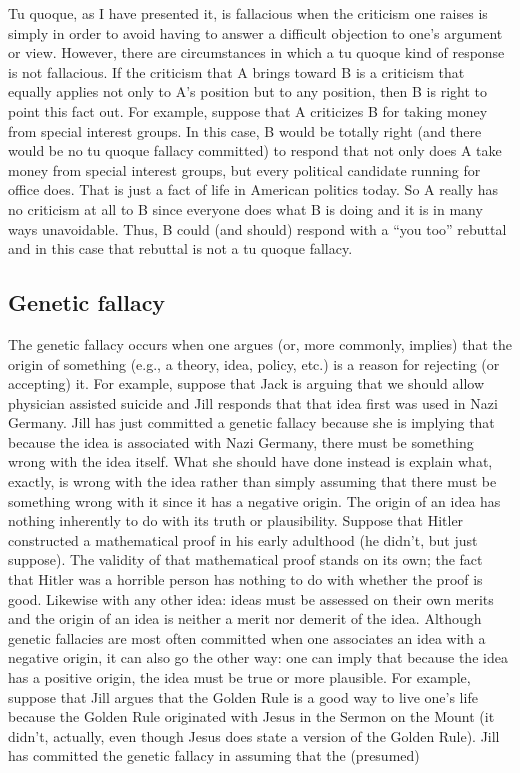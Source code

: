Tu quoque, as I have presented it, is fallacious when the criticism one raises is
simply in order to avoid having to answer a difficult objection to one's argument
or view. However, there are circumstances in which a tu quoque kind of
response is not fallacious. If the criticism that A brings toward B is a criticism
that equally applies not only to A's position but to any position, then B is right to
point this fact out. For example, suppose that A criticizes B for taking money
from special interest groups. In this case, B would be totally right (and there
would be no tu quoque fallacy committed) to respond that not only does A take
money from special interest groups, but every political candidate running for
office does. That is just a fact of life in American politics today. So A really has
no criticism at all to B since everyone does what B is doing and it is in many
ways unavoidable. Thus, B could (and should) respond with a ``you too'' rebuttal
and in this case that rebuttal is not a tu quoque fallacy.

\subsection{Genetic fallacy}
The genetic fallacy occurs when one argues (or, more commonly, implies) that
the origin of something (e.g., a theory, idea, policy, etc.) is a reason for rejecting
(or accepting) it. For example, suppose that Jack is arguing that we should
allow physician assisted suicide and Jill responds that that idea first was used in
Nazi Germany. Jill has just committed a genetic fallacy because she is implying
that because the idea is associated with Nazi Germany, there must be
something wrong with the idea itself. What she should have done instead is
explain what, exactly, is wrong with the idea rather than simply assuming that
there must be something wrong with it since it has a negative origin. The origin
of an idea has nothing inherently to do with its truth or plausibility. Suppose
that Hitler constructed a mathematical proof in his early adulthood (he didn't,
but just suppose). The validity of that mathematical proof stands on its own; the
fact that Hitler was a horrible person has nothing to do with whether the proof is
good. Likewise with any other idea: ideas must be assessed on their own merits
and the origin of an idea is neither a merit nor demerit of the idea.
Although genetic fallacies are most often committed when one associates an
idea with a negative origin, it can also go the other way: one can imply that
because the idea has a positive origin, the idea must be true or more plausible.
For example, suppose that Jill argues that the Golden Rule is a good way to live
one's life because the Golden Rule originated with Jesus in the Sermon on the
Mount (it didn't, actually, even though Jesus does state a version of the Golden
Rule). Jill has committed the genetic fallacy in assuming that the (presumed)

